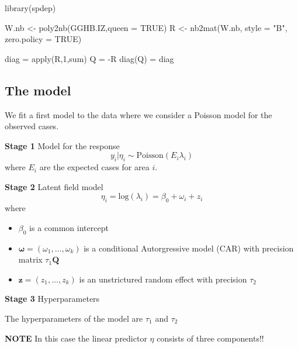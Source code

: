 \documentclass[
  letterpaper,
  DIV=11,
  numbers=noendperiod]{scrartcl}
\newenvironment{Shaded}{\begin{snugshade}}{\end{snugshade}}
\newcommand{\AttributeTok}[1]{\textcolor[rgb]{0.40,0.45,0.13}{#1}}
\newcommand{\ConstantTok}[1]{\textcolor[rgb]{0.56,0.35,0.01}{#1}}
\newcommand{\DecValTok}[1]{\textcolor[rgb]{0.68,0.00,0.00}{#1}}
\newcommand{\FunctionTok}[1]{\textcolor[rgb]{0.28,0.35,0.67}{#1}}
\newcommand{\NormalTok}[1]{\textcolor[rgb]{0.00,0.23,0.31}{#1}}
\newcommand{\OtherTok}[1]{\textcolor[rgb]{0.00,0.23,0.31}{#1}}
\newcommand{\SpecialCharTok}[1]{\textcolor[rgb]{0.37,0.37,0.37}{#1}}
\newcommand{\StringTok}[1]{\textcolor[rgb]{0.13,0.47,0.30}{#1}}
\providecommand{\tightlist}{%
  \setlength{\itemsep}{0pt}\setlength{\parskip}{0pt}}\usepackage{longtable,booktabs,array}
\begin{document}
\begin{Shaded}
\begin{Highlighting}[]
\FunctionTok{library}\NormalTok{(spdep)}

\NormalTok{W.nb }\OtherTok{\textless{}{-}} \FunctionTok{poly2nb}\NormalTok{(GGHB.IZ,}\AttributeTok{queen =} \ConstantTok{TRUE}\NormalTok{)}
\NormalTok{R }\OtherTok{\textless{}{-}} \FunctionTok{nb2mat}\NormalTok{(W.nb, }\AttributeTok{style =} \StringTok{"B"}\NormalTok{, }\AttributeTok{zero.policy =} \ConstantTok{TRUE}\NormalTok{)}

\NormalTok{diag }\OtherTok{=} \FunctionTok{apply}\NormalTok{(R,}\DecValTok{1}\NormalTok{,sum)}
\NormalTok{Q }\OtherTok{=} \SpecialCharTok{{-}}\NormalTok{R}
\FunctionTok{diag}\NormalTok{(Q) }\OtherTok{=}\NormalTok{ diag}
\end{Highlighting}
\end{Shaded}

\subsection{The model}\label{the-model}

We fit a first model to the data where we consider a Poisson model for
the observed cases.

\textbf{Stage 1} Model for the response \[
y_i|\eta_i\sim\text{Poisson}(E_i\lambda_i)
\] where \(E_i\) are the expected cases for area \(i\).

\textbf{Stage 2} Latent field model \[
\eta_i = \text{log}(\lambda_i) = \beta_0 + \omega_i + z_i
\] where

\begin{itemize}
\tightlist
\item
  \(\beta_0\) is a common intercept
\item
  \(\mathbf{\omega} = (\omega_1, \dots, \omega_k)\) is a conditional
  Autorgressive model (CAR) with precision matrix \(\tau_1\mathbf{Q}\)
\item
  \(\mathbf{z} = (z_1, \dots, z_k)\) is an unstrictured random effect
  with precision \(\tau_2\)
\end{itemize}

\textbf{Stage 3} Hyperparameters

The hyperparameters of the model are \(\tau_1\) and \(\tau_2\)

\textbf{NOTE} In this case the linear predictor \(\eta\) consists of
three components!!
\end{document}
